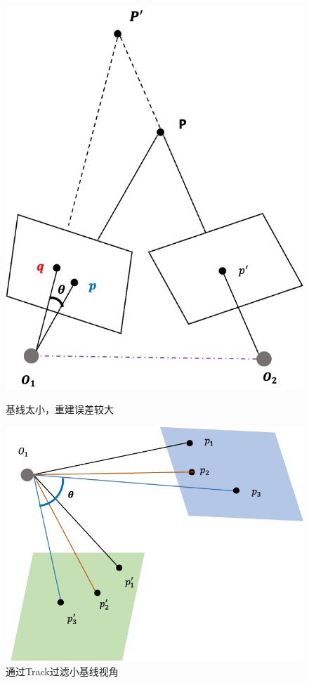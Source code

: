 	\begin{figure}[H]
		\begin{minipage}[t]{0.48\linewidth}
			\centering
			\includegraphics[width=\textwidth]{../images/baseline_error.png}
			\caption{基线太小，重建误差较大}
		\end{minipage}		
		\begin{minipage}[t]{0.52\linewidth}
			\centering
			\includegraphics[width=\textwidth]{../images/track_filter.png}
			\caption{通过Track过滤小基线视角}
		\end{minipage}			
	\end{figure}

